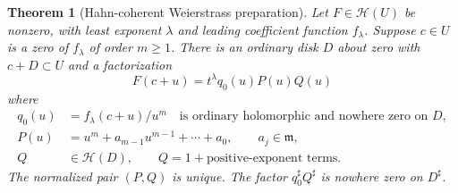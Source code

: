 \documentclass[11pt,letterpaper]{article}
\newtheorem{theorem}{Theorem}[section]
\theoremstyle{definition}
\theoremstyle{remark}
\newcommand{\HH}{\mathcal H}
\newcommand{\mm}{\mathfrak m}
\newcommand{\sh}{^{\sharp}}
\numberwithin{equation}{section}
\begin{document}
\begin{theorem}[Hahn-coherent Weierstrass preparation]\label{thm:preparation}
Let $F\in\HH(U)$ be nonzero, with least exponent $\lambda$ and leading coefficient function $f_\lambda$. Suppose $c\in U$ is a zero of $f_\lambda$ of order $m\ge1$. There is an ordinary disk $D$ about zero with $c+D\subset U$ and a factorization
\begin{equation}\label{eq:preparation}
 F(c+u)=t^\lambda q_0(u)P(u)Q(u)
\end{equation}
where
\begin{align*}
 q_0(u)&=f_\lambda(c+u)/u^m\quad\text{is ordinary holomorphic and nowhere zero on }D,\\
 P(u)&=u^m+a_{m-1}u^{m-1}+\cdots+a_0,\qquad a_j\in\mm,\\
 Q&\in\HH(D),\qquad Q=1+\text{positive-exponent terms}.
\end{align*}
The normalized pair $(P,Q)$ is unique. The factor $q_0\sh Q\sh$ is nowhere zero on $D\sh$.
\end{theorem}
\end{document}
